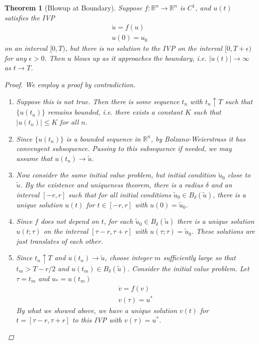 \documentclass[10pt]{article}         %
\newtheorem{theorem}{Theorem}[section]
\theoremstyle{remark}
\newcommand{\R}{\mathbb{R}}
\begin{document}
\begin{theorem}[Blowup at Boundary]
Suppose $f: \R^n \rightarrow \R^n$ is $C^1$, and $u(t)$ satisfies the IVP
\begin{align*}
\dot{u} = f(u) \\
u(0) = u_0 
\end{align*}
on an interval $[0, T)$, but there is no solution to the IVP on the interval $[0, T + \epsilon)$ for any $\epsilon > 0$. Then $u$ blows up as it approaches the boundary, i.e. $|u(t)| \rightarrow \infty$ as $t \rightarrow T$.

\begin{proof}
We employ a proof by contradiction.
\begin{enumerate}
\item Suppose this is not true. Then there is some sequence $t_n$ with $t_n \uparrow T$ such that $\{ u(t_n) \}$ remains bounded, i.e. there exists a constant $K$ such that $|u(t_n)| \leq K$ for all $n$.

\item Since $\{ u(t_n) \}$ is a bounded sequence in $\R^n$, by Bolzano-Weierstrass it has convengent subsequence. Passing to this subsequence if needed, we may assume that $u(t_n) \rightarrow \tilde{u}$.

\item Now consider the same initial value problem, but initial condition $\tilde{u}_0$ close to $\tilde{u}$. By the existence and uniqueness theorem, there is a radius $\delta$ and an interval $[-r, r]$ such that for all initial conditions $\tilde{u}_0 \in B_\delta(\tilde{u})$, there is a unique solution $u(t)$ for $t \in [-r, r]$ with $u(0) = \tilde{u}_0$. 

\item Since $f$ does not depend on $t$, for each $\tilde{u}_0 \in B_\delta(\tilde{u})$ there is a unique solution $u(t; \tau)$ on the interval $[\tau - r, \tau + r]$ with $u(\tau; \tau) = \tilde{u}_0$. These solutions are just translates of each other.

\item Since $t_n \uparrow T$ and $u(t_n) \rightarrow \tilde{u}$, choose integer $m$ sufficiently large so that $t_m > T - r/2$ and
$u(t_m) \in B_\delta(\tilde{u})$. Consider the initial value problem. Let $\tau = t_m$ and $u_* = u(t_m)$
\begin{align*}
\dot{v} = f(v) \\
v(\tau) = u^*
\end{align*}
By what we showed above, we have a unique solution $v(t)$ for $t = [\tau - r, \tau + r]$ to this IVP with $v(\tau) = u^*$.


\end{enumerate}
\end{proof}
\end{theorem}
\end{document}
